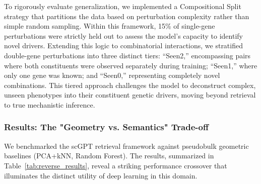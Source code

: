 \documentclass[conference]{IEEEtran}
\begin{document}
To rigorously evaluate generalization, we implemented a Compositional Split strategy that partitions the data based on perturbation complexity rather than simple random sampling. Within this framework, 15\% of single-gene perturbations were strictly held out to assess the model's capacity to identify novel drivers. Extending this logic to combinatorial interactions, we stratified double-gene perturbations into three distinct tiers: ``Seen2,'' encompassing pairs where both constituents were observed separately during training; ``Seen1,'' where only one gene was known; and ``Seen0,'' representing completely novel combinations. This tiered approach challenges the model to deconstruct complex, unseen phenotypes into their constituent genetic drivers, moving beyond retrieval to true mechanistic inference.

\subsubsection{Results: The "Geometry vs. Semantics" Trade-off}
We benchmarked the scGPT retrieval framework against pseudobulk geometric baselines (PCA+kNN, Random Forest). The results, summarized in Table~\ref{tab:reverse_results}, reveal a striking performance crossover that illuminates the distinct utility of deep learning in this domain.
\end{document}
